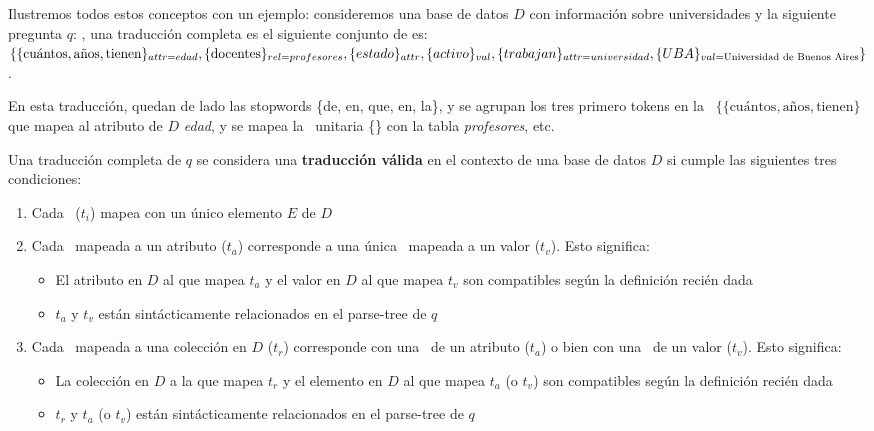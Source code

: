 Ilustremos todos estos conceptos con un ejemplo: consideremos una base de datos $D$ con información sobre universidades y la siguiente pregunta $q$: , una traducción completa es el siguiente conjunto de \tradqd es: $\{\{\text{cuántos}, \text{años}, \text{tienen}\}_{attr=edad}, \{\text{docentes}\}_{rel=profesores}, \newline \{estado\}_{attr}, \{activo\}_{val}, \{trabajan\}_{attr=universidad}, \{UBA\}_{val=\text{Universidad de Buenos Aires}}\}$. 

En esta traducción, quedan de lado las stopwords \{de, en, que, en, la\}, y se agrupan los tres primero tokens en la \tradqd\ $\{\{\text{cuántos}, \text{años}, \text{tienen}\}$ que mapea al atributo de $D$ \textit{edad}, y se mapea la \tradqd\ unitaria \{\} con la tabla \textit{profesores}, etc. 

Una traducción completa de $q$ se considera una \textbf{traducción válida} en el contexto de una base de datos $D$ si cumple las siguientes tres condiciones:
\begin{enumerate}
  \item Cada \tradqd\  ($t_i$) mapea con un único elemento $E$ de $D$
  \item Cada \tradqd\  mapeada a un atributo ($t_a$) corresponde a una única \tradqd\ mapeada a un valor ($t_v$). Esto significa:
    \begin{itemize}
      \item El atributo en $D$ al que mapea $t_a$ y el valor en $D$ al que mapea $t_v$ son compatibles según la definición recién dada
      \item $t_a$ y $t_v$ están sintácticamente relacionados en el parse-tree de $q$
    \end{itemize}
  \item Cada \tradqd\  mapeada a una colección en $D$ ($t_r$) corresponde con una \tradqd\  de un atributo ($t_a$) o bien con una \tradqd\  de un valor ($t_v$). Esto significa:
      \begin{itemize}
      \item La colección en $D$ a la que mapea $t_r$ y el elemento en $D$ al que mapea $t_a$ (o $t_v$) son compatibles según la definición recién dada
      \item $t_r$ y $t_a$ (o $t_v$) están sintácticamente relacionados en el parse-tree de $q$
    \end{itemize}
\end{enumerate}

